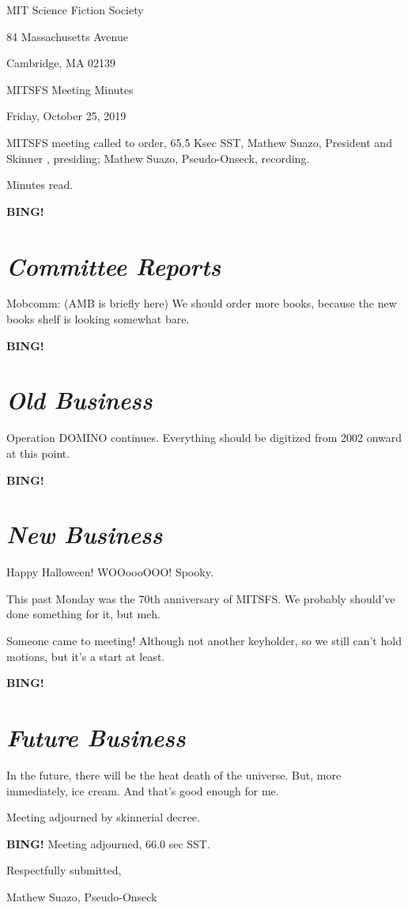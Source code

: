 \documentclass[10pt]{article}
\newcommand{\bing}{{\bf BING!} }
\newcommand{\goto}[1]{\bing \vskip 12pt \section*{{\em{#1}}}}
\newcommand{\skinner}{Mathew Suazo, President and Skinner }
\newcommand{\onseck}{Mathew Suazo, Pseudo-Onseck}
\newcommand{\meetingdate}{Friday, October 25, 2019 }
\begin{document}
\begin{center}

MIT Science Fiction Society

84 Massachusetts Avenue

Cambridge, MA 02139

\vspace{12pt}

MITSFS Meeting Minutes

\meetingdate

\end{center}

\vspace{18pt}

\setlength{\parskip}{6pt}

\noindent
MITSFS meeting called to order, 65.5 Ksec SST,
\skinner, presiding; \onseck, recording.

Minutes read.

\goto{Committee Reports}

Mobcomm: (AMB is briefly here) We should order more books, because the new books shelf is looking somewhat bare.

\goto{Old Business}

Operation DOMINO continues. Everything should be digitized from 2002 onward at this point.

\goto{New Business}

Happy Halloween! WOOoooOOO! Spooky.

This past Monday was the 70th anniversary of MITSFS. We probably should've done something for it, but meh.

Someone came to meeting! Although not another keyholder, so we still can't hold motions, but it's a start at least.

\goto{Future Business}

In the future, there will be the heat death of the universe. But, more immediately, ice cream. And that's good enough for me.

Meeting adjourned by skinnerial decree.

\bing
\noindent
Meeting adjourned, 66.0 sec SST.

\vspace{18pt}

\centerline{Respectfully submitted,}
\centerline{\onseck}
\end{document}
